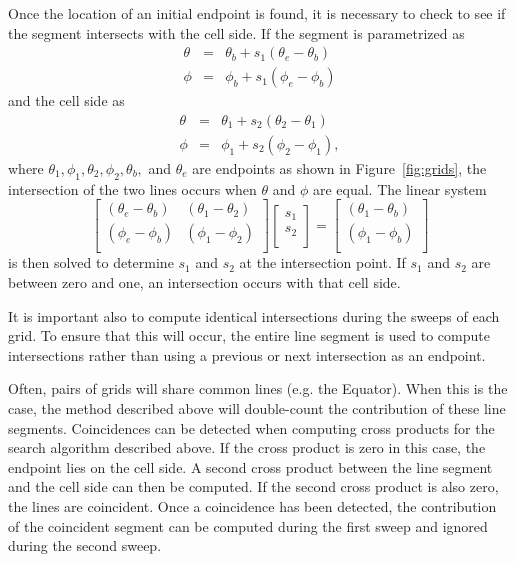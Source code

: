 \begin{description}
     Once the location of an initial endpoint is found, it is necessary to check
     to see if the segment intersects with the cell side.  If the segment is
     parametrized as
\begin{eqnarray}
\theta &=& \theta_b + s_1 (\theta_e - \theta_b) \nonumber \\
\phi   &=& \phi_b + s_1 (\phi_e - \phi_b) 
\end{eqnarray}
     and the cell side as
\begin{eqnarray}
\theta &=& \theta_1 + s_2 (\theta_2 - \theta_1) \nonumber \\
\phi   &=& \phi_1 + s_2 (\phi_2 - \phi_1),
\end{eqnarray}
     where $\theta_1, \phi_1, \theta_2, \phi_2, \theta_b,$ and $\theta_e$ are
     endpoints as shown in Figure~\ref{fig:grids}, the intersection of the two
     lines occurs when $\theta$ and $\phi$ are equal.  The linear system 
\begin{equation}
\left[ \begin{array}{cc} 
(\theta_e - \theta_b) & (\theta_1 - \theta_2) \\
(\phi_e - \phi_b) & (\phi_1 - \phi_2) \\
\end{array} \right]
\left[ \begin{array}{c} s_1 \\ s_2 \\ \end{array} \right] = 
\left[ \begin{array}{c} 
(\theta_1 - \theta_b) \\ (\phi_1 - \phi_b)  \\
\end{array} \right]
\end{equation}
     is then solved to determine $s_1$ and $s_2$ at the intersection point.  If
     $s_1$ and $s_2$ are between zero and one, an intersection occurs with that
     cell side. 

     It is important also to compute identical intersections during the sweeps
     of each grid.  To ensure that this will occur, the entire line segment is
     used to compute intersections rather than using a previous or next
     intersection as an endpoint.


     Often, pairs of grids will share common lines (e.g. the Equator).  When
     this is the case, the method described above will double-count the
     contribution of these line segments.  Coincidences can be detected when
     computing cross products for the search algorithm described above.  If
     the cross product is zero in this case, the endpoint lies on the cell
     side.  A second cross product between the line segment and the cell side
     can then be computed.  If the second cross product is also zero, the
     lines are coincident.  Once a coincidence has been detected, the
     contribution of the coincident segment can be computed during the
     first sweep and ignored during the second sweep.


\end{description}
